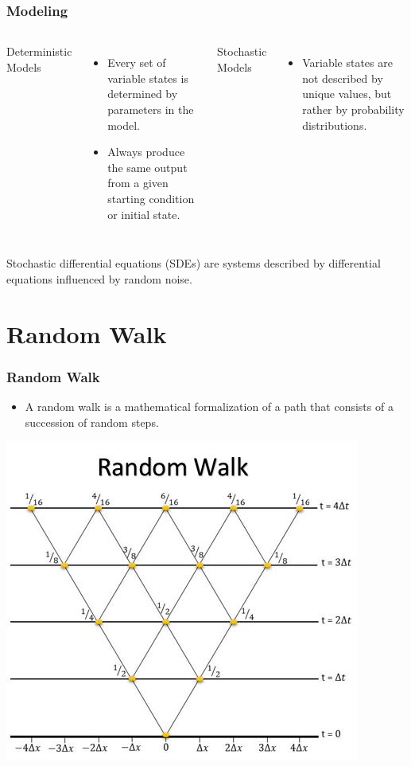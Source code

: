 \begin{frame}
\frametitle{Modeling}
\begin{columns}[t]
Deterministic Models
\begin{itemize}
\item Every set of variable states is determined by parameters in the model.
\item Always produce the same output from a given starting condition or initial state.
\end{itemize}

Stochastic Models
\begin{itemize}
\item Variable states are not described by unique values, but rather by probability distributions.
\end{itemize}
\end{columns}

\bigskip
\centering
 Stochastic differential equations (SDEs) are systems described by differential equations influenced by random noise.
\end{frame}

\section{Random Walk}
\begin{frame}
  \frametitle{Random Walk}
  \begin{itemize}
  \item A random walk is a mathematical formalization of a path that consists of a succession of random steps.
  \end{itemize}
  \centering
  \includegraphics[scale=0.67]{RandomWalk}
\end{frame}

